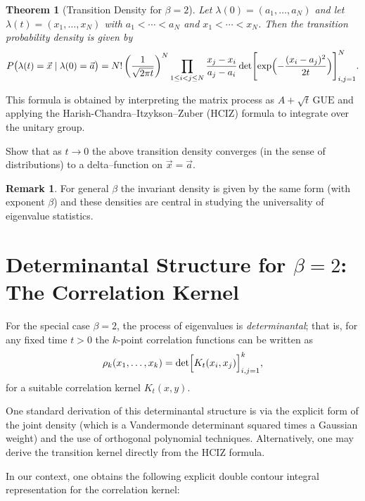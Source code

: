 \documentclass[letterpaper,11pt,oneside,reqno]{article}
\numberwithin{equation}{section}
\newtheorem{theorem}[proposition]{Theorem}
\theoremstyle{definition}
\newtheorem{remark}[proposition]{Remark}
\begin{document}
\begin{theorem}[Transition Density for \(\beta=2\)]
Let \(\lambda(0)=(a_1,\dots,a_N)\) and let \(\lambda(t)=(x_1,\dots,x_N)\) with \(a_1<\cdots<a_N\) and \(x_1<\cdots<x_N\). Then the transition probability density is given by
\[
P\bigl(\lambda(t)=\vec{x}\mid \lambda(0)=\vec{a}\bigr)
=N! \left(\frac{1}{\sqrt{2\pi t}}\right)^N \prod_{1\le i<j\le N}\frac{x_j-x_i}{a_j-a_i} \det\Biggl[\exp\Bigl(-\frac{(x_i-a_j)^2}{2t}\Bigr)\Biggr]_{i,j=1}^N.
\]
\end{theorem}

This formula is obtained by interpreting the matrix process as \(A+\sqrt{t}\,\text{GUE}\) and applying the Harish-Chandra--Itzykson--Zuber (HCIZ) formula to integrate over the unitary group.

\begin{exercise}
Show that as \(t\to 0\) the above transition density converges (in the sense of distributions) to a delta–function on \(\vec{x}=\vec{a}\).
\end{exercise}

\begin{remark}
For general \(\beta\) the invariant density is given by the same form (with exponent \(\beta\)) and these densities are central in studying the universality of eigenvalue statistics.
\end{remark}

\section{Determinantal Structure for \(\beta=2\): The Correlation Kernel}

For the special case \(\beta=2\), the process of eigenvalues is \emph{determinantal}; that is, for any fixed time \(t>0\) the \(k\)-point correlation functions can be written as
\[
\rho_k(x_1,\dots,x_k)=\det\Bigl[K_t(x_i,x_j)\Bigr]_{i,j=1}^k,
\]
for a suitable correlation kernel \(K_t(x,y)\).

One standard derivation of this determinantal structure is via the explicit form of the joint density (which is a Vandermonde determinant squared times a Gaussian weight) and the use of orthogonal polynomial techniques. Alternatively, one may derive the transition kernel directly from the HCIZ formula.

In our context, one obtains the following explicit double contour integral representation for the correlation kernel:
\end{document}
